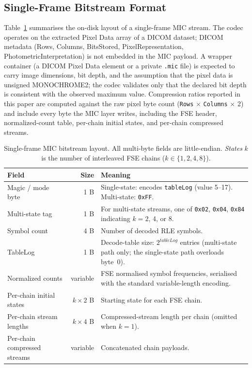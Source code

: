 \documentclass[journal]{IEEEtran}
\begin{document}
\subsection{Single-Frame Bitstream Format}
\label{subsec:format}

Table~\ref{tab:format} summarises the on-disk layout of a single-frame MIC
stream. The codec operates on the extracted Pixel Data array of a DICOM
dataset; DICOM metadata (Rows, Columns, BitsStored, PixelRepresentation,
PhotometricInterpretation) is not embedded in the MIC payload. A wrapper
container (a DICOM Pixel Data element or a private \texttt{.mic} file) is
expected to carry image dimensions, bit depth, and the assumption that the
pixel data is unsigned MONOCHROME2; the codec validates only that the
declared bit depth is consistent with the observed maximum value.
Compression ratios reported in this paper are computed against the raw pixel
byte count (\texttt{Rows}$\,\times\,$\texttt{Columns}$\,\times\,$2) and
include every byte the MIC layer writes, including the FSE header,
normalized-count table, per-chain initial states, and per-chain compressed
streams.

\begin{table}[htbp]
\centering
\caption{Single-frame MIC bitstream layout. All multi-byte fields are
little-endian. \emph{States} $k$ is the number of interleaved FSE chains
($k \in \{1,2,4,8\}$).}
\label{tab:format}
\scriptsize
\begin{tabular}{p{2.4cm}rp{4.4cm}}
\toprule
Field & Size & Meaning \\
\midrule
Magic / mode byte & 1 B & Single-state: encodes \texttt{tableLog} (value 5--17). Multi-state: \texttt{0xFF}. \\
Multi-state tag & 1 B & For multi-state streams, one of \texttt{0x02}, \texttt{0x04}, \texttt{0x84} indicating $k=2$, 4, or 8. \\
Symbol count & 4 B & Number of decoded RLE symbols. \\
TableLog & 1 B & Decode-table size: $2^{\textit{tableLog}}$ entries (multi-state path only; the single-state path overloads byte~0). \\
Normalized counts & variable & FSE normalised symbol frequencies, serialised with the standard variable-length encoding. \\
Per-chain initial states & $k \times 2$ B & Starting state for each FSE chain. \\
Per-chain stream lengths & $k \times 4$ B & Compressed-stream length per chain (omitted when $k=1$). \\
Per-chain compressed streams & variable & Concatenated chain payloads. \\
\bottomrule
\end{tabular}
\end{table}
\end{document}
